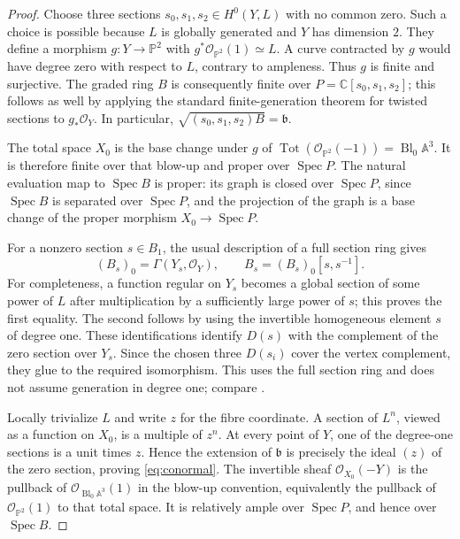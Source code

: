 \documentclass[11pt,reqno]{amsart}
\numberwithin{equation}{section}
\theoremstyle{definition}
\theoremstyle{remark}
\newcommand{\C}{\mathbb C}
\newcommand{\PP}{\mathbb P}
\newcommand{\A}{\mathbb A}
\newcommand{\OO}{\mathcal O}
\newcommand{\bb}{\mathfrak b}
\newcommand{\Spec}{\operatorname{Spec}}
\newcommand{\Tot}{\operatorname{Tot}}
\newcommand{\Bl}{\operatorname{Bl}}
\begin{document}
\begin{proof}
Choose three sections $s_0,s_1,s_2\in H^0(Y,L)$ with no common zero.
Such a choice is possible because $L$ is globally generated and $Y$
has dimension $2$. They define a morphism
$g:Y\to\PP^2$ with $g^*\OO_{\PP^2}(1)\simeq L$.
A curve contracted by $g$ would have degree zero with respect to $L$,
contrary to ampleness. Thus $g$ is finite and surjective. The graded
ring $B$ is consequently finite over
$P=\C[s_0,s_1,s_2]$; this follows as well by applying the standard
finite-generation theorem for twisted sections to $g_*\OO_Y$.
In particular, $\sqrt{(s_0,s_1,s_2)B}=\bb$.

The total space $X_0$ is the base change under $g$ of
$\Tot(\OO_{\PP^2}(-1))=\Bl_0\A^3$. It is therefore finite over that
blow-up and proper over $\Spec P$. The natural evaluation map to
$\Spec B$ is proper: its graph is closed over $\Spec P$, since
$\Spec B$ is separated over $\Spec P$, and the projection of the
graph is a base change of the proper morphism $X_0\to\Spec P$.

For a nonzero section $s\in B_1$, the usual description of a full
section ring gives
\begin{equation}\label{eq:local-cone}
 (B_s)_0=\Gamma(Y_s,\OO_Y),\qquad
 B_s=(B_s)_0[s,s^{-1}].
\end{equation}
For completeness, a function regular on $Y_s$ becomes a global section
of some power of $L$ after multiplication by a sufficiently large
power of $s$; this proves the first equality. The second follows by
using the invertible homogeneous element $s$ of degree one. These
identifications identify $D(s)$ with the complement of the zero
section over $Y_s$. Since the chosen three $D(s_i)$ cover the vertex
complement, they glue to the required isomorphism. This uses the full
section ring and does not assume generation in degree one; compare
\cite[Lemma 1.2]{Anghel2026}.

Locally trivialize $L$ and write $z$ for the fibre coordinate. A section
of $L^n$, viewed as a function on $X_0$, is a multiple of $z^n$.
At every point of $Y$, one of the degree-one sections is a unit times
$z$. Hence the extension of $\bb$ is precisely the ideal $(z)$ of the
zero section, proving \eqref{eq:conormal}.
The invertible sheaf $\OO_{X_0}(-Y)$ is the pullback of
$\OO_{\Bl_0\A^3}(1)$ in the blow-up convention, equivalently the
pullback of $\OO_{\PP^2}(1)$ to that total space. It is relatively
ample over $\Spec P$, and hence over $\Spec B$.


\end{proof}
\end{document}

